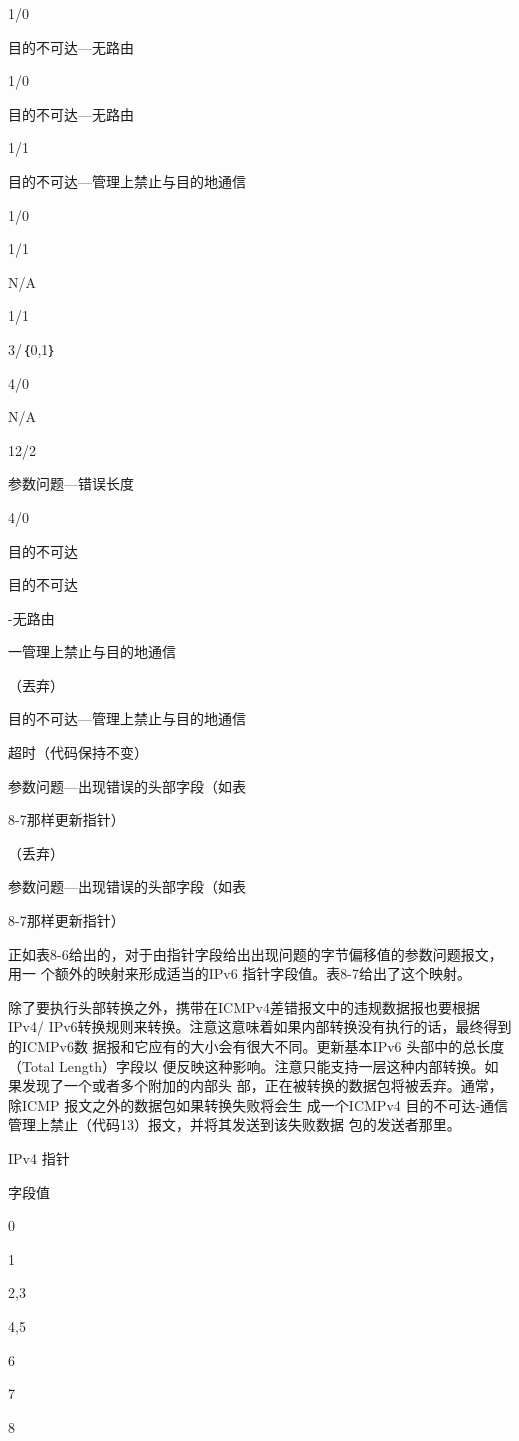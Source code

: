 1/0

目的不可达—无路由

1/0

目的不可达—无路由

1/1

目的不可达—管理上禁止与目的地通信

1/0

1/1

N/A

1/1

3/｛0,1｝

4/0

N/A

12/2

参数问题—错误长度

4/0

目的不可达

目的不可达

-无路由

一管理上禁止与目的地通信

（丟弃）

目的不可达—管理上禁止与目的地通信

超时（代码保持不变）

参数问题—出现错误的头部字段（如表

8-7那样更新指针）

（丢弃）

参数问题—出现错误的头部字段（如表

8-7那样更新指针）

正如表8-6给出的，对于由指针字段给出出现问题的字节偏移值的参数问题报文，用一
个额外的映射来形成适当的IPv6 指针字段值。表8-7给出了这个映射。

除了要执行头部转换之外，携带在ICMPv4差错报文中的违规数据报也要根据IPv4/
IPv6转换规则来转换。注意这意味着如果内部转换没有执行的话，最终得到的ICMPv6数
据报和它应有的大小会有很大不同。更新基本IPv6 头部中的总长度（Total Length）字段以
便反映这种影响。注意只能支持一层这种内部转换。如果发现了一个或者多个附加的内部头
部，正在被转换的数据包将被丢弃。通常，除ICMP 报文之外的数据包如果转换失败将会生
成一个ICMPv4 目的不可达-通信管理上禁止（代码13）报文，并将其发送到该失败数据
包的发送者那里。

IPv4 指针

字段值

0

1

2,3

4,5

6

7

8

